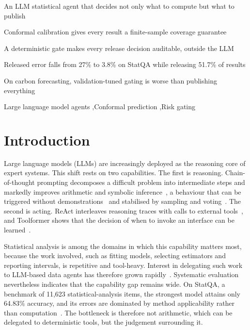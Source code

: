 \documentclass[preprint,12pt,authoryear]{elsarticle}
\begin{document}
\begin{frontmatter}
\begin{highlights}
\item An LLM statistical agent that decides not only what to compute but what to publish
\item Conformal calibration gives every result a finite-sample coverage guarantee
\item A deterministic gate makes every release decision auditable, outside the LLM
\item Released error falls from 27\% to 3.8\% on StatQA while releasing 51.7\% of results
\item On carbon forecasting, validation-tuned gating is worse than publishing everything
\end{highlights}

\begin{keyword}

Large language model agents \sep Conformal prediction \sep Risk gating
\end{keyword}

\end{frontmatter}

\section{Introduction}
\label{sec1}



Large language models (LLMs) are increasingly deployed as the reasoning core of expert systems. This shift rests on two capabilities. The first is reasoning. Chain-of-thought prompting decomposes a difficult problem into intermediate steps and markedly improves arithmetic and symbolic inference~\citep{wei2022chain}, a behaviour that can be triggered without demonstrations~\citep{kojima2022large} and stabilised by sampling and voting~\citep{wang2023self}. The second is acting. ReAct interleaves reasoning traces with calls to external tools~\citep{yao2023react}, and Toolformer shows that the decision of when to invoke an interface can be learned~\citep{schick2023toolformer}.

Statistical analysis is among the domains in which this capability matters most, because the work involved, such as fitting models, selecting estimators and reporting intervals, is repetitive and tool-heavy. Interest in delegating such work to LLM-based data agents has therefore grown rapidly~\citep{sun2026survey}. Systematic evaluation nevertheless indicates that the capability gap remains wide. On StatQA, a benchmark of 11{,}623 statistical-analysis items, the strongest model attains only 64.83\% accuracy, and its errors are dominated by method applicability rather than computation~\citep{zhu2024large}. The bottleneck is therefore not arithmetic, which can be delegated to deterministic tools, but the judgement surrounding it.
\end{document}
